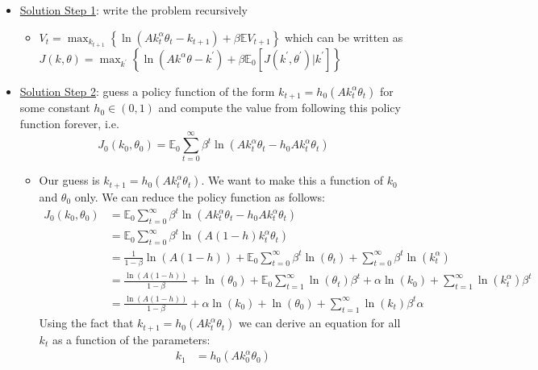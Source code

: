 \documentclass{article}
\begin{document}
\begin{itemize}
    \item  \underline{Solution Step 1}: write the problem recursively
    \begin{itemize}
        \item  $V_{t} = \max_{k_{t+1}} \left\{ \ln(Ak_{t}^{\alpha}\theta_{t} - k_{t+1}) + \beta \mathbb{E} V_{t+1} \right\}$ which can be written as $J(k, \theta) = \max_{k^{'}} \left\{ \ln (Ak^{\alpha} \theta - k^{'}) + \beta \mathbb{E}_{0} [J(k^{'},\theta^{'})|k^{'}] \right\}$
    \end{itemize}
    \item  \underline{Solution Step 2}: guess a policy function of the form $k_{t+1} = h_{0}(Ak_{t}^{\alpha}\theta_{t})$ for some constant $h_{0} \in (0,1)$ and compute the value from following this policy function forever, i.e. $$J_{0} (k_{0}, \theta_{0}) = \mathbb{E}_{0} \sum_{t=0}^{\infty} \beta^{t} \ln (Ak_{t}^{\alpha}\theta_{t} - h_{0} Ak_{t}^{\alpha} \theta_{t})$$
    \begin{itemize}
        \item  Our guess is $k_{t+1} = h_{0} (Ak_{t}^{\alpha} \theta_{t})$. We want to make this a function of $k_{0}$ and $\theta_{0}$ only. We can reduce the policy function as follows:
        \begin{align*}
            J_{0}(k_{0}, \theta_{0}) &= \mathbb{E}_{0} \sum_{t=0}^{\infty} \beta^{t} \ln (Ak_{t}^{\alpha}\theta_{t} - h_{0}Ak_{t}^{\alpha} \theta_{t}) \\
            &= \mathbb{E}_{0} \sum_{t=0}^{\infty} \beta^{t} \ln (A(1-h)k_{t}^{\alpha}\theta_{t}) \\
            &= \tfrac{1}{1 - \beta} \ln(A(1-h)) + \mathbb{E}_{0} \sum_{t=0}^{\infty} \beta^{t} \ln (\theta_{t}) + \sum_{t=0}^{\infty} \beta^{t} \ln (k_{t}^{\alpha}) \\
            &= \tfrac{\ln (A(1-h))}{1 - \beta} + \ln(\theta_{0}) + \mathbb{E}_{0} \sum_{t=1}^{\infty} \ln (\theta_{t}) \beta^{t} + \alpha \ln (k_{0}) + \sum_{t=1}^{\infty} \ln (k_{t}^{\alpha}) \beta^{t} \\
            &= \tfrac{\ln (A(1-h))}{1 - \beta} + \alpha \ln (k_{0}) + \ln (\theta_{0}) + \sum_{t=1}^{\infty} \ln (k_{t})\beta^{t} \alpha
        \end{align*}
        Using the fact that $k_{t+1} = h_{0}(Ak_{t}^{\alpha}\theta_{t})$ we can derive an equation for all $k_{t}$ as a function of the parameters:
        \begin{align*}
            k_{1} &= h_{0}(Ak_{0}^{\alpha}\theta_{0}) \\

\end{align*}
\end{itemize}
\end{itemize}
\end{document}
